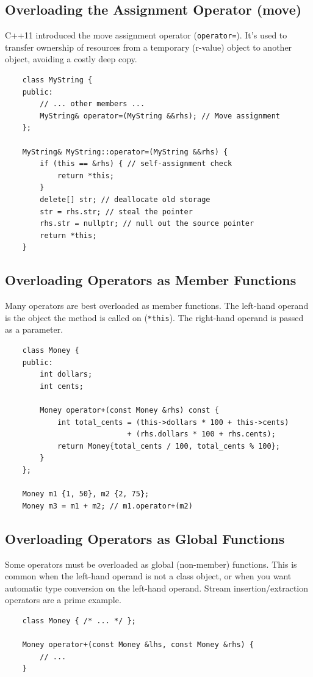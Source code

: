 \subsection{Overloading the Assignment Operator (move)}
C++11 introduced the move assignment operator (\texttt{operator=}). It's used to transfer ownership of resources from a temporary (r-value) object to another object, avoiding a costly deep copy.
\begin{lstlisting}
	class MyString {
	public:
		// ... other members ...
		MyString& operator=(MyString &&rhs); // Move assignment
	};

	MyString& MyString::operator=(MyString &&rhs) {
		if (this == &rhs) { // self-assignment check
			return *this;
		}
		delete[] str; // deallocate old storage
		str = rhs.str; // steal the pointer
		rhs.str = nullptr; // null out the source pointer
		return *this;
	}
\end{lstlisting}

\subsection{Overloading Operators as Member Functions}
Many operators are best overloaded as member functions. The left-hand operand is the object the method is called on (\texttt{*this}). The right-hand operand is passed as a parameter.
\begin{lstlisting}
	class Money {
	public:
		int dollars;
		int cents;

		Money operator+(const Money &rhs) const {
			int total_cents = (this->dollars * 100 + this->cents)
			                + (rhs.dollars * 100 + rhs.cents);
			return Money{total_cents / 100, total_cents % 100};
		}
	};

	Money m1 {1, 50}, m2 {2, 75};
	Money m3 = m1 + m2; // m1.operator+(m2)
\end{lstlisting}

\subsection{Overloading Operators as Global Functions}
Some operators must be overloaded as global (non-member) functions. This is common when the left-hand operand is not a class object, or when you want automatic type conversion on the left-hand operand. Stream insertion/extraction operators are a prime example.
\begin{lstlisting}
	class Money { /* ... */ };

	Money operator+(const Money &lhs, const Money &rhs) {
		// ...
	}
\end{lstlisting}

